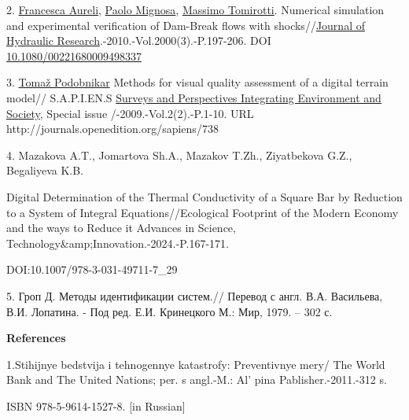 2.
\href{https://www.researchgate.net/profile/Francesca-Aureli?_tp=eyJjb250ZXh0Ijp7ImZpcnN0UGFnZSI6InB1YmxpY2F0aW9uIiwicGFnZSI6InB1YmxpY2F0aW9uIn19}{Francesca
Aureli},
\href{https://www.researchgate.net/profile/Paolo-Mignosa?_tp=eyJjb250ZXh0Ijp7ImZpcnN0UGFnZSI6InB1YmxpY2F0aW9uIiwicGFnZSI6InB1YmxpY2F0aW9uIn19}{Paolo
Mignosa},
\href{https://www.researchgate.net/profile/Massimo-Tomirotti?_tp=eyJjb250ZXh0Ijp7ImZpcnN0UGFnZSI6InB1YmxpY2F0aW9uIiwicGFnZSI6InB1YmxpY2F0aW9uIn19}{Massimo
Tomirotti}. Numerical simulation and experimental verification of
Dam-Break flows with
shocks//\href{https://www.researchgate.net/journal/Journal-of-Hydraulic-Research-1814-2079?_tp=eyJjb250ZXh0Ijp7ImZpcnN0UGFnZSI6InB1YmxpY2F0aW9uIiwicGFnZSI6InB1YmxpY2F0aW9uIn19}{Journal
of Hydraulic Research}.-2010.-Vol.2000(3).-P.197-206. DOI
\href{http://dx.doi.org/10.1080/00221680009498337}{10.1080/00221680009498337}

3.
\href{https://www.researchgate.net/profile/Tomaz-Podobnikar?_tp=eyJjb250ZXh0Ijp7ImZpcnN0UGFnZSI6InB1YmxpY2F0aW9uIiwicGFnZSI6InB1YmxpY2F0aW9uIn19}{Tomaž
Podobnikar} Methods for visual quality assessment of a digital terrain
model// S.A.P.I.EN.S
\href{https://www.researchgate.net/journal/Surveys-and-Perspectives-Integrating-Environment-and-Society-1993-3819?_tp=eyJjb250ZXh0Ijp7ImZpcnN0UGFnZSI6InB1YmxpY2F0aW9uIiwicGFnZSI6InB1YmxpY2F0aW9uIn19}{Surveys
and Perspectives Integrating Environment and Society}, Special issue
/-2009.-Vol.2(2).-P.1-10. URL
http://journals.openedition.org/sapiens/738

4. Mazakova A.T., Jomartova Sh.A., Mazakov T.Zh., Ziyatbekova G.Z.,
Begaliyeva K.B.

Digital Determination of the Thermal Conductivity of a Square Bar by
Reduction to a System of Integral Equations//Ecological Footprint of the
Modern Economy and the ways to Reduce it Advances in Science,
Technology\&amp;Innovation.-2024.-P.167-171.

DOI:10.1007/978-3-031-49711-7\_29

5. Гроп Д. Методы идентификации систем.// Перевод с англ. В.А.
Васильева, В.И. Лопатина. - Под ред. Е.И. Кринецкого М.: Мир, 1979. --
302 с.

{\bfseries References}

1.Stihijnye bedstvija i tehnogennye katastrofy: Preventivnye mery/ The
World Bank and The United Nations; per. s angl.-M.:
Al' pina Pablisher.-2011.-312 s.

ISBN 978-5-9614-1527-8. {[}in Russian{]}

